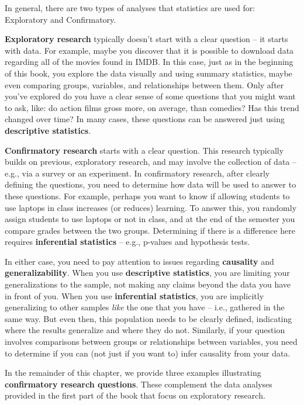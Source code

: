 \documentclass[
  letterpaper,
  DIV=11,
  numbers=noendperiod]{scrreprt}
\theoremstyle{definition}
\theoremstyle{remark}
\begin{document}
In general, there are two types of analyses that statistics are used
for: Exploratory and Confirmatory.

\textbf{Exploratory research} typically doesn't start with a clear
question -- it starts with data. For example, maybe you discover that it
is possible to download data regarding all of the movies found in IMDB.
In this case, just as in the beginning of this book, you explore the
data visually and using summary statistics, maybe even comparing groups,
variables, and relationships between them. Only after you've explored do
you have a clear sense of some questions that you might want to ask,
like: do action films gross more, on average, than comedies? Has this
trend changed over time? In many cases, these questions can be answered
just using \textbf{descriptive statistics}.

\textbf{Confirmatory research} starts with a clear question. This
research typically builds on previous, exploratory research, and may
involve the collection of data -- e.g., via a survey or an experiment.
In confirmatory research, after clearly defining the questions, you need
to determine how data will be used to answer to these questions. For
example, perhaps you want to know if allowing students to use laptops in
class increases (or reduces) learning. To answer this, you randomly
assign students to use laptops or not in class, and at the end of the
semester you compare grades between the two groups. Determining if there
is a difference here requires \textbf{inferential statistics} -- e.g.,
p-values and hypothesis tests.

In either case, you need to pay attention to issues regarding
\textbf{causality} and \textbf{generalizability}. When you use
\textbf{descriptive statistics}, you are limiting your generalizations
to the sample, not making any claims beyond the data you have in front
of you. When you use \textbf{inferential statistics}, you are implicitly
generalizing to other samples \emph{like} the one that you have -- i.e.,
gathered in the same way. But even then, this population needs to be
clearly defined, indicating where the results generalize and where they
do not. Similarly, if your question involves comparisons between groups
or relationships between variables, you need to determine if you can
(not just if you want to) infer causality from your data.

In the remainder of this chapter, we provide three examples illustrating
\textbf{confirmatory research questions}. These complement the data
analyses provided in the first part of the book that focus on
exploratory research.
\end{document}
